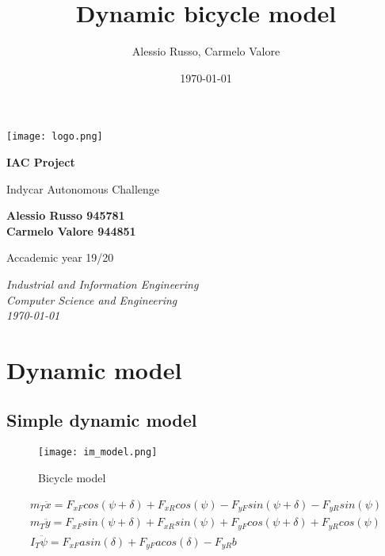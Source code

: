 \documentclass{report}
\title{\textbf{Dynamic bicycle model}}
\author{Alessio Russo, Carmelo Valore}
\date{\today}
\let\Oldsection\section
\renewcommand{\section}{\FloatBarrier\Oldsection}
\begin{document}
\begin{titlepage}
    \begin{center}
        \texttt{[image: logo.png]}

		\vspace{1cm}

		\Huge
        \textbf{IAC Project}

        \vspace{0.5cm}

		\large
        Indycar Autonomous Challenge 

        \vspace{0.8cm}

 		\normalsize
        \textbf{Alessio Russo 945781\\Carmelo Valore 944851}

        \vfill

		\normalsize
        Accademic year 19/20

        \vspace{0.8cm}

		\normalsize

        \textit{Industrial and Information Engineering}\\
        \textit{Computer Science and Engineering}\\
        \textit{\today}\\

    \end{center}
\end{titlepage}

\newpage
\tableofcontents
\newpage

\chapter{Dynamic model}
\section{Simple dynamic model}

\begin{figure}[h!]
    \centering
    \texttt{[image: im\_model.png]}
    \caption{Bicycle model}
    \label{fig:bmodel}
\end{figure}

\begin{equation}
\begin{aligned}
m_T \ddot{x} = F_{xF} cos(\psi+\delta) + F_{xR} cos(\psi) - F_{yF} sin(\psi+\delta) - F_{yR} sin(\psi) \\
m_T \ddot{y} = F_{xF} sin(\psi+\delta) + F_{xR} sin(\psi) + F_{yF} cos(\psi+\delta) + F_{yR} cos(\psi) \\
I_T \ddot{\psi} = F_{xF} a sin(\delta) + F_{yF} a cos(\delta) - F_{yR} b\\\\
\end{aligned}
\end{equation}
\end{document}
